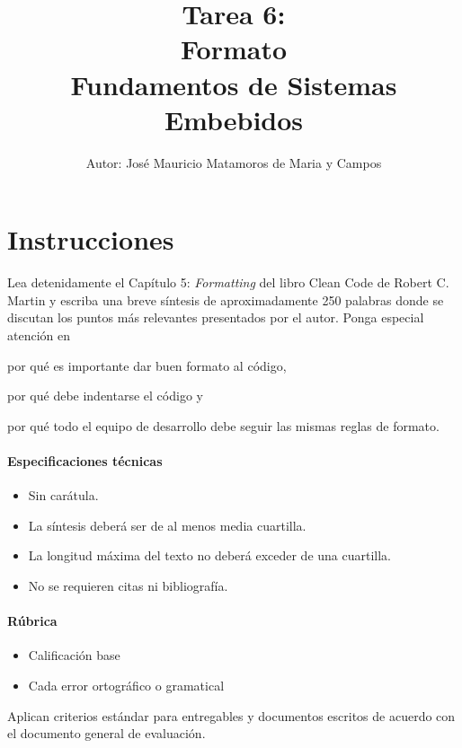 \documentclass[letterpaper,10.5pt]{article}
\title{Tarea 6:\\Formato\\
{\large Fundamentos de Sistemas Embebidos}}
\author{\footnotesize Autor: José Mauricio Matamoros de Maria y Campos}
\date{}
\begin{document}
\maketitle
\thispagestyle{empty}


\section{Instrucciones}%
\label{sec:instructions}
Lea detenidamente el Capítulo 5: \emph{Formatting} del libro Clean Code de Robert C. Martin y escriba una breve síntesis de aproximadamente 250 palabras donde se discutan los puntos más relevantes presentados por el autor.
Ponga especial atención en
\begin{enumerate*}[label=\roman*\rpar]
	\item por qué es importante dar buen formato al código,
	\item por qué debe indentarse el código
	y
	\item por qué todo el equipo de desarrollo debe seguir las mismas reglas de formato.
\end{enumerate*}

\paragraph{Especificaciones técnicas}
\begin{itemize}
	\item Sin carátula.
	\item La síntesis deberá ser de al menos media cuartilla.
	\item La longitud máxima del texto no deberá exceder de una cuartilla.
	\item No se requieren citas ni bibliografía.
\end{itemize}

\paragraph{Rúbrica}
\begin{itemize}
	\item {} Calificación base
	\item {} Cada error ortográfico o gramatical
\end{itemize}
Aplican criterios estándar para entregables y documentos escritos de acuerdo con el documento general de evaluación.
\end{document}
